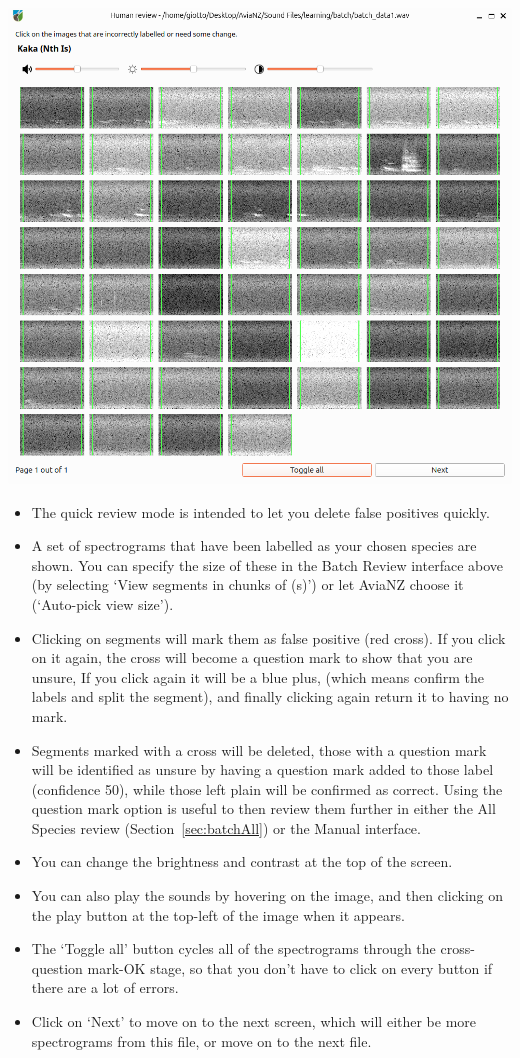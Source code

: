 \documentclass{article}
\begin{document}
\begin{center}
	\includegraphics[width=.9\textwidth]{Figures/BatchReview2}
\end{center}

\begin{itemize}
\item The quick review mode is intended to let you delete false positives quickly. 
\item A set of spectrograms that have been labelled as your chosen species are shown. You can specify the size of these in the Batch Review interface above (by selecting `View segments in chunks of (s)') or let AviaNZ choose it (`Auto-pick view size').
\item Clicking on segments will mark them as false positive (red cross).  If you click on it again, the cross will become a question mark to show that you are unsure, If you click again it will be a blue plus, (which means confirm the labels and split the segment), and finally clicking again return it to having no mark.
\item Segments marked with a cross will be deleted, those with a question mark will be identified as unsure by having a question mark added to those label (confidence 50), while those left plain will be confirmed as correct. Using the question mark option is useful to then review them further in either the All Species review (Section~\ref{sec:batchAll}) or the Manual interface.
\item You can change the brightness and contrast at the top of the screen.
\item You can also play the sounds by hovering on the image, and then clicking on the play button at the top-left of the image when it appears. 
\item The `Toggle all' button cycles all of the spectrograms through the cross-question mark-OK stage, so that you don't have to click on every button if there are a lot of errors. 
\item Click on `Next' to move on to the next screen, which will either be more spectrograms from this file, or move on to the next file. 
\end{itemize}
\end{document}
